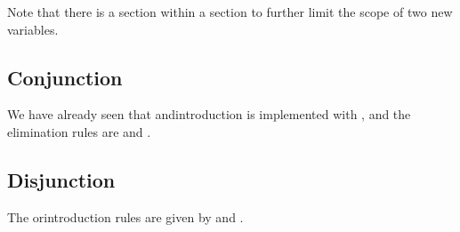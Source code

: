 \documentclass[letterpaper,10pt,english]{sphinxmanual}
\begin{document}
\sphinxAtStartPar
Note that there is a section within a section to further limit the scope of
two new variables.


\subsection{Conjunction}
\label{\detokenize{propositional_logic_in_lean:conjunction}}
\sphinxAtStartPar
We have already seen that and\sphinxhyphen{}introduction is implemented with , and the elimination rules are  and .

\begin{sphinxVerbatim}[commandchars=\\\{\}]
      

        

     

     
     
\end{sphinxVerbatim}


\subsection{Disjunction}
\label{\detokenize{propositional_logic_in_lean:disjunction}}
\sphinxAtStartPar
The or\sphinxhyphen{}introduction rules are given by  and .

\begin{sphinxVerbatim}[commandchars=\\\{\}]
   

       

   

       
\end{sphinxVerbatim}
\end{document}
